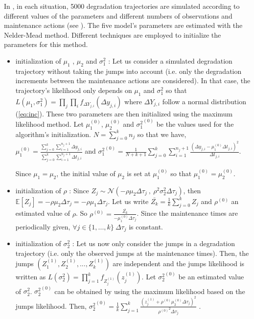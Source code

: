 In , in each situation, 5000 degradation trajectories are simulated according to different values of the parameters and different numbers of observations and maintenance actions (see ). The five model's parameters are estimated with the Nelder-Mead method. 
\noindent Different techniques are employed to initialize the parameters for this method.
\begin{itemize}
\item initialization of $\mu_1$ , $\mu_2$ and $\sigma_1^2$ : 
Let us consider a simulated degradation trajectory without taking the jumps into account (i.e. only the degradation increments between the maintenance actions are considered). In that case, the trajectory's likelihood only depends on  $\mu_1$ and $\sigma_1^2$ so that $L(\mu_1,\sigma_1^2)=\prod \limits_j\prod \limits_i f_{\Delta Y_{j,i}}(\Delta y_{j,i})$ where $\Delta Y_{j,i}$ follow a normal distribution (\ref{eq:inc}). These two parameters are then initialized using the maximum likelihood method. Let $\mu_1^{(0)}$, $\mu_2^{(0)}$ and ${\sigma_1^2}^{(0)}$  be the values used for the algorithm's initialization.  $N=\sum\limits_{j=0}^k n_j$ so that we have,\\
 $\displaystyle \mu_1^{(0)}=\frac{\sum\limits_{j=0}^k\sum\limits_{i=1}^{n_j+1} \Delta y_{j,i}}{\sum\limits_{j=0}^k\sum\limits_{i=1}^{n_j+1} \Delta t_{j,i}}$ and $\displaystyle {\sigma_1^2}^{(0)}=\frac{1}{N+k+1}\sum\limits_{j=0}^k\sum\limits_{i=1}^{n_j+1}\frac{(\Delta y_{j,i}-\mu_1^{(0)} \Delta t_{j,i})^2}{ \Delta t_{j,i}}$.
 
\noindent Since $\mu_1=\mu_2$, the initial value of $\mu_2$ is set at $\mu_1^{(0)}$ so that $\mu_1^{(0)}=\mu_2^{(0)}$.

\item initialization of $\rho$ :  Since $Z_j\sim \mathcal{N}\left(-\rho \mu_2 \Delta \tau_j\ ,\  \rho^2 \sigma_2^2 \Delta \tau_j\right)$, then $\mathbb{E}[Z_j]=-\rho \mu_2 \Delta \tau_j=-\rho \mu_1 \Delta \tau_j$. Let us write $\bar{Z_k}=\frac{1}{k}\sum\limits_{j=0}^k Z_j$ and $\rho^{(0)}$ an estimated value of $\rho$. So $\displaystyle \rho^{(0)}=\frac{\bar{Z_k}}{-\mu_1^{(0)}\Delta \tau_j}$. Since the maintenance times are periodically given, $\forall j  \in \{1,...,k\}\ \Delta \tau_j$ is constant.

\item initialization of $\sigma^2_2$ : 
\noindent Let us now only consider the jumps in a degradation trajectory (i.e. only the observed jumps at the maintenance times). Then, the jumps $(Z_1^{(1)},Z_2^{(1)},...,Z_k^{(1)})$ are independent and the jumps likelihood is written as $L( \sigma_2^2)=\prod\limits_{j=1}^k f_{Z_j^{(1)}}(z_j^{(1)})$.  Let ${\sigma_2^2}^{(0)}$ be an estimated value of $\sigma_2^2$. ${\sigma_2^2}^{(0)}$ can be obtained by using the maximum likelihood based on the jumps likelihood. Then,  ${\sigma_2^2}^{(0)}=\frac{1}{k} \sum \limits_{j=1}^k \frac{(z_j^{(1)}+\rho^{(0)}\mu_2^{(0)}\Delta \tau_j)^2}{{\rho^{(0)}}^2\Delta \tau_j}$ .


\end{itemize}
